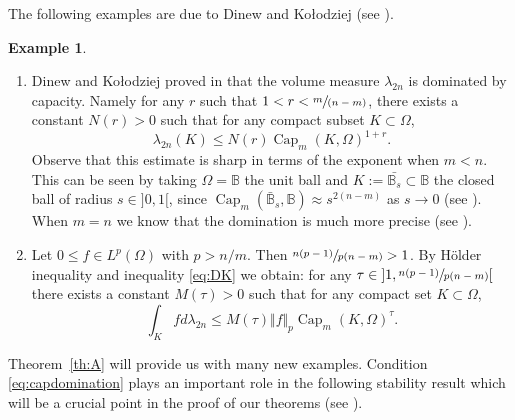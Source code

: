 \documentclass[11pt]{article}
\newcommand{\skpt}{\smallskip}
\numberwithin{equation}{section}
\newcommand{\spfrac}[2]{\sfrac{#1}{(#2)}}
\theoremstyle{definition}
\newtheorem{example}[theorem]{Example}
\newcommand{\B}{\mathbb{B}}
\DeclareMathOperator{\Capa}{Cap}
\theoremstyle{plain}
\theoremstyle{definition}
\begin{document}
The following examples are due to Dinew and Ko\l odziej (see \cite{DK14}).
\skpt
\begin{example}
\begin{enumerate}
\item
Dinew and Ko\l odziej proved in \cite{DK14} that the volume measure $\lambda_{2 n}$ is dominated by capacity. Namely for any $r$ such that $1 < r < \spfrac{m}{n - m}$, there exists a constant $N (r) > 0$ such that for any compact subset $K \subset \Omega$,
\begin{equation} \label{eq:DK}
\lambda_{2 n} (K) \leq N (r) \Capa_m (K,\Omega)^{1+ r}.
\end{equation}
Observe that this estimate is sharp in terms of the exponent when $m < n$. This can be seen by taking $\Omega = \B$ the unit ball and $K:= \bar{\B_s} \subset \B$ the closed ball of radius $s \in{}]0,1[$, since $\Capa_m(\bar{\B}_s,\B) \approx s^{2 (n-m)}$ as $s \to 0$ (see \cite{Lu12}).
When $m=n$ we know that the domination is much more precise (see \cite{ACKPZ09}).

\item
Let $ 0 \leq f \in L^p (\Omega)$ with $p > n \slash m$. Then $ \sfrac{n (p-1)}{p (n - m)} > 1$. By Hölder inequality and inequality \eqref{eq:DK} we obtain: for any $\tau\in{}]1,\sfrac{n (p-1)}{p (n - m)}[$ there exists a constant $M (\tau) > 0$ such that for any compact set $K \subset \Omega$,
\begin{equation} \label{eq:DK2}
\int_K f d \lambda_{2 n} \leq M (\tau) \Vert f\Vert_p \Capa_m (K,\Omega)^{\tau}.
\end{equation}
\end{enumerate}
\end{example}

Theorem~\ref{th:A} will provide us with many new examples. Condition \eqref{eq:capdomination} plays an important role in the following stability result which will be a crucial point in the proof of our theorems (see \cite{EGZ09, GKZ08, Ch16}).
\end{document}
